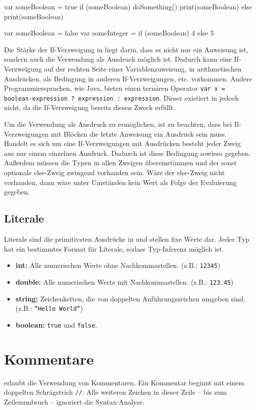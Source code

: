 \begin{ToyaCode}[numbers=none, caption={If-Verzweigung als klassische Anweisung.}, label=lst:intro_ifexpanded]
var someBoolean = true
if (someBoolean) {
    doSomething()
    print(someBoolean)
} else {
    print(someBoolean)
}
\end{ToyaCode}

\begin{ToyaCode}[numbers=none, caption={If-Verzweigung als Ausdruck in einer Variablenzuweisung.}, label=lst:intro_ifexpression]
var someBoolean = false
var someInteger = if (someBoolean) 4 else 5
\end{ToyaCode}

Die Stärke der If-Verzweigung in \toya liegt darin, dass es nicht nur ein Anweisung ist, sondern auch die Verwendung als Ausdruck möglich ist. Dadurch kann eine If-Verzweigung auf der rechten Seite einer Variablenzuweisung, in arithmetischen Ausdrücken, als Bedingung in anderen If-Verzweigungen, etc. vorkommen. Andere Programmiersprachen, wie Java, bieten einen ternären Operator \texttt{var x = boolean-expression ? expression : expression}. Dieser existiert in \toya jedoch nicht, da die If-Verzweigung bereits diesen Zweck erfüllt. 

Um die Verwendung als Ausdruck zu ermöglichen, ist zu beachten, dass bei If-Verzweigungen mit Blöcken die letzte Anweisung ein Ausdruck sein muss. Handelt es sich um eine If-Verzweigungen mit Ausdrücken besteht jeder Zweig aus nur einem einzelnen Ausdruck. Dadurch ist diese Bedingung sowieso gegeben. Außerdem müssen die Typen in allen Zweigen übereinstimmen und der sonst optionale else-Zweig zwingend vorhanden sein. Wäre der else-Zweig nicht vorhanden, dann wäre unter Umständen kein Wert als Folge der Evaluierung gegeben.

\subsection{Literale}

Literale sind die primitivsten Ausdrücke in \toya und stellen fixe Werte dar. Jeder Typ hat ein bestimmtes Format für Literale, sodass Typ-Inferenz möglich ist. 

\begin{itemize}
    \item \textbf{int:} Alle numerischen Werte ohne Nachkommastellen. (z.B.: \texttt{12345})
    \item \textbf{double:} Alle numerischen Werte mit Nachkommastellen. (z.B.: \texttt{123.45})
    \item \textbf{string:} Zeichenketten, die von doppelten Anführungszeichen umgeben sind. (z.B.: \texttt{``Hello World''})
    \item \textbf{boolean:} \texttt{true} und \texttt{false}. 
\end{itemize}

\section{Kommentare}

\toya erlaubt die Verwendung von Kommentaren. Ein Kommentar beginnt mit einem doppelten Schrägstrich \texttt{//}. Alle weiteren Zeichen in dieser Zeile -- bis zum Zeilenumbruch -- ignoriert die Syntax-Analyse.